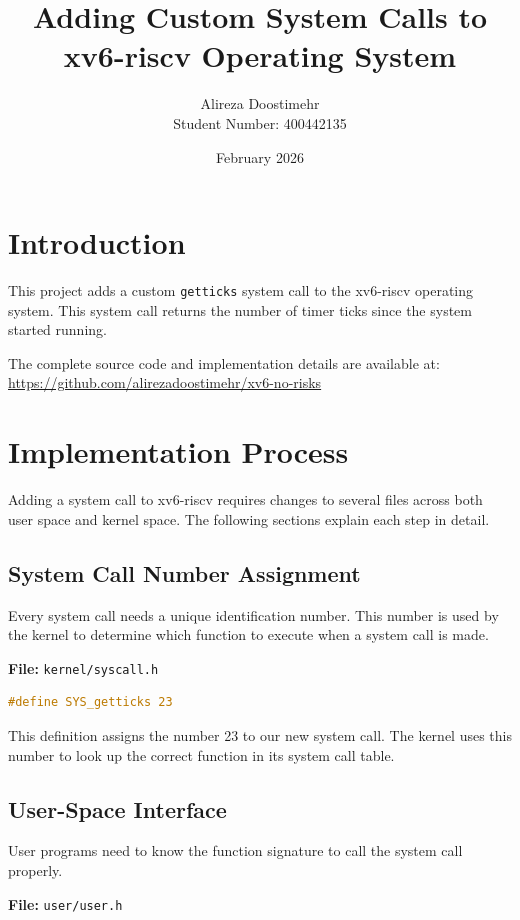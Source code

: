 \documentclass[a4paper]{article}
\title{Adding Custom System Calls to xv6-riscv Operating System}
\author{\normalsize Alireza Doostimehr \\\normalsize Student Number: 400442135}
\date{\color{black}February 2026}
\begin{document}
\maketitle

\section{Introduction}

This project adds a custom \texttt{getticks} system call to the xv6-riscv operating system. This system call returns the number of timer ticks since the system started running.

The complete source code and implementation details are available at:
\url{https://github.com/alirezadoostimehr/xv6-no-risks}

\section{Implementation Process}

Adding a system call to xv6-riscv requires changes to several files across both user space and kernel space. The following sections explain each step in detail.

\subsection{System Call Number Assignment}

Every system call needs a unique identification number. This number is used by the kernel to determine which function to execute when a system call is made.

\textbf{File:} \texttt{kernel/syscall.h}

\begin{lstlisting}[style=code, language=C]
#define SYS_getticks 23
\end{lstlisting}

This definition assigns the number 23 to our new system call. The kernel uses this number to look up the correct function in its system call table.

\subsection{User-Space Interface}

User programs need to know the function signature to call the system call properly.

\textbf{File:} \texttt{user/user.h}
\end{document}
